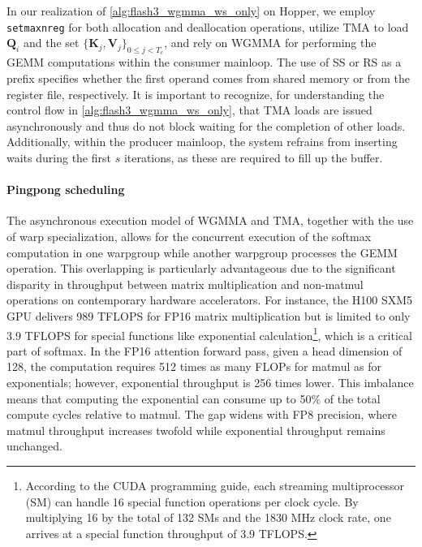 In our realization of \cref{alg:flash3_wgmma_ws_only} on Hopper, we employ \verb|setmaxnreg| for both allocation and deallocation operations, utilize TMA to load $\mathbf{Q}_i$ and the set $\{ \mathbf{K}_j, \mathbf{V}_j \}_{0 \leq j < T_c}$, and rely on WGMMA for performing the GEMM computations within the consumer mainloop. The use of SS or RS as a prefix specifies whether the first operand comes from shared memory or from the register file, respectively. It is important to recognize, for understanding the control flow in \cref{alg:flash3_wgmma_ws_only}, that TMA loads are issued asynchronously and thus do not block waiting for the completion of other loads. Additionally, within the producer mainloop, the system refrains from inserting waits during the first $s$ iterations, as these are required to fill up the buffer.

\paragraph{Pingpong scheduling} The asynchronous execution model of WGMMA and TMA, together with the use of warp specialization, allows for the concurrent execution of the softmax computation in one warpgroup while another warpgroup processes the GEMM operation. This overlapping is particularly advantageous due to the significant disparity in throughput between matrix multiplication and non-matmul operations on contemporary hardware accelerators. For instance, the H100 SXM5 GPU delivers 989 TFLOPS for FP16 matrix multiplication but is limited to only 3.9 TFLOPS for special functions like exponential calculation\footnote{According to the CUDA programming guide, each streaming multiprocessor (SM) can handle 16 special function operations per clock cycle. By multiplying 16 by the total of 132 SMs and the 1830 MHz clock rate, one arrives at a special function throughput of 3.9 TFLOPS.}, which is a critical part of softmax. In the FP16 attention forward pass, given a head dimension of 128, the computation requires 512 times as many FLOPs for matmul as for exponentials; however, exponential throughput is 256 times lower. This imbalance means that computing the exponential can consume up to 50\% of the total compute cycles relative to matmul. The gap widens with FP8 precision, where matmul throughput increases twofold while exponential throughput remains unchanged.

